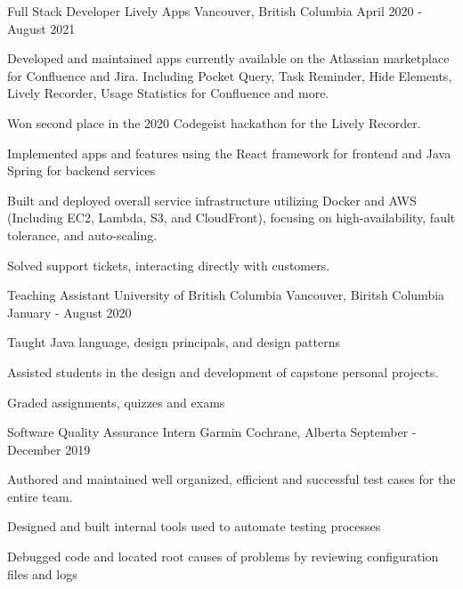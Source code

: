 \begin{cventries}
  \cventry
    {Full Stack Developer} %
    {Lively Apps} %
    {Vancouver, British Columbia} %
    {April 2020 - August 2021} %
    {
      \begin{cvitems} %
        \item {Developed and maintained apps currently available on the Atlassian marketplace for Confluence and Jira. Including Pocket Query, Task Reminder, Hide Elements, Lively Recorder, Usage Statistics for Confluence and more.}
        \item {Won second place in the 2020 Codegeist hackathon for the Lively Recorder.}
        \item {Implemented apps and features using the React framework for frontend and Java Spring for backend services}
        \item {Built and deployed overall service infrastructure utilizing Docker and AWS (Including EC2, Lambda, S3, and CloudFront), focusing on high-availability, fault tolerance, and auto-scaling.}
        \item {Solved support tickets, interacting directly with customers.}
      \end{cvitems}
    }


  \cventry
    {Teaching Assistant} %
    {University of British Columbia} %
    {Vancouver, Biritsh Columbia} %
    {January - August 2020} %
    {
      \begin{cvitems} %
        \item {Taught Java language, design principals, and design patterns}
        \item {Assisted students in the design and development of capstone personal projects.}
        \item {Graded assignments, quizzes and exams}
      \end{cvitems}
    }

  \cventry
    {Software Quality Assurance Intern} %
    {Garmin} %
    {Cochrane, Alberta} %
    {September - December 2019} %
    {
      \begin{cvitems} %
        \item {Authored and maintained well organized, efficient and successful test cases for the entire team.}
        \item {Designed and built internal tools used to automate testing processes}
        \item {Debugged code and located root causes of problems by reviewing configuration files and logs}
      \end{cvitems}
    }

\end{cventries}
